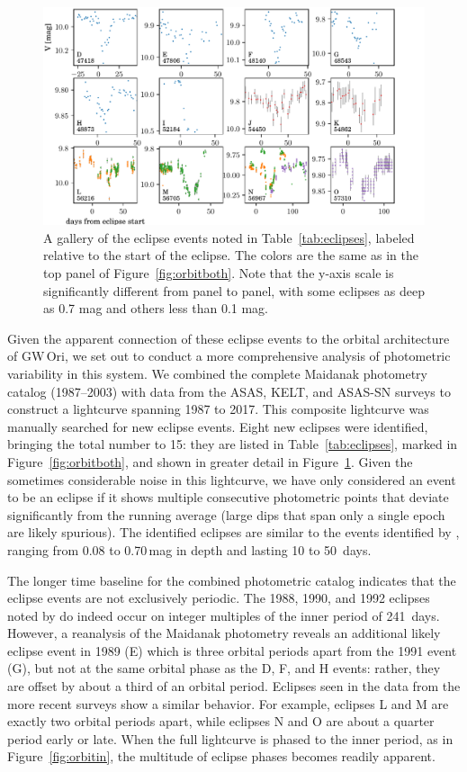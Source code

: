 \documentclass[twocolumn]{aastex61}
\newcommand{\obj}{GW\,Ori}
\begin{document}
\begin{figure}[!ht]
\includegraphics{eclipse-gallery.pdf}
\caption{A gallery of the eclipse events noted in Table~\ref{tab:eclipses}, labeled relative to the start of the eclipse. The colors are the same as in the top panel of Figure~\ref{fig:orbitboth}. Note that the y-axis scale is significantly different from panel to panel, with some eclipses as deep as 0.7 mag and others less than 0.1 mag.}
\label{fig:eclipse-gallery}
\end{figure}

Given the apparent connection of these eclipse events to the orbital architecture of \obj, we set out to conduct a more comprehensive analysis of photometric variability in this system. We combined the complete Maidanak photometry catalog (1987--2003) with data from the ASAS, KELT, and ASAS-SN surveys to construct a lightcurve spanning 1987 to 2017. This composite lightcurve was manually searched for new eclipse events.  Eight new eclipses were identified, bringing the total number to 15: they are listed in Table~\ref{tab:eclipses}, marked in Figure~\ref{fig:orbitboth}, and shown in greater detail in Figure~\ref{fig:eclipse-gallery}. Given the sometimes considerable noise in this lightcurve, we have only considered an event to be an eclipse if it shows multiple consecutive photometric points that deviate significantly from the running average (large dips that span only a single epoch are likely spurious). The identified eclipses are similar to the events identified by \citet{shevchenko92,shevchenko98}, ranging from 0.08 to 0.70\,mag in depth and lasting 10 to \mbox{50 days}. 

The longer time baseline for the combined photometric catalog indicates that the eclipse events are not exclusively periodic.  The 1988, 1990, and 1992 eclipses noted by \citet{shevchenko98} do indeed occur on integer multiples of the inner period of \mbox{241 days}. However, a reanalysis of the Maidanak photometry reveals an additional likely eclipse event in 1989 (E) which is three orbital periods apart from the 1991 event (G), but not at the same orbital phase as the D, F, and H events: rather, they are offset by about a third of an orbital period. Eclipses seen in the data from the more recent surveys show a similar behavior. For example, eclipses L and M are exactly two orbital periods apart, while eclipses N and O are about a quarter period early or late. When the full lightcurve is phased to the inner period, as in Figure~\ref{fig:orbitin}, the multitude of eclipse phases becomes readily apparent.
\end{document}
